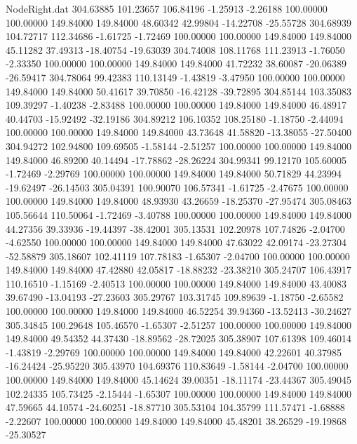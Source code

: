 \begin{filecontents}{NodeRight.dat}
 304.63885  101.23657  106.84196    -1.25913   -2.26188  100.00000  100.00000  149.84000  149.84000   48.60342   42.99804  -14.22708  -25.55728
 304.68939  104.72717  112.34686    -1.61725   -1.72469  100.00000  100.00000  149.84000  149.84000   45.11282   37.49313  -18.40754  -19.63039
 304.74008  108.11768  111.23913    -1.76050   -2.33350  100.00000  100.00000  149.84000  149.84000   41.72232   38.60087  -20.06389  -26.59417
 304.78064   99.42383  110.13149    -1.43819   -3.47950  100.00000  100.00000  149.84000  149.84000   50.41617   39.70850  -16.42128  -39.72895
 304.85144  103.35083  109.39297    -1.40238   -2.83488  100.00000  100.00000  149.84000  149.84000   46.48917   40.44703  -15.92492  -32.19186
 304.89212  106.10352  108.25180    -1.18750   -2.44094  100.00000  100.00000  149.84000  149.84000   43.73648   41.58820  -13.38055  -27.50400
 304.94272  102.94800  109.69505    -1.58144   -2.51257  100.00000  100.00000  149.84000  149.84000   46.89200   40.14494  -17.78862  -28.26224
 304.99341   99.12170  105.60005    -1.72469   -2.29769  100.00000  100.00000  149.84000  149.84000   50.71829   44.23994  -19.62497  -26.14503
 305.04391  100.90070  106.57341    -1.61725   -2.47675  100.00000  100.00000  149.84000  149.84000   48.93930   43.26659  -18.25370  -27.95474
 305.08463  105.56644  110.50064    -1.72469   -3.40788  100.00000  100.00000  149.84000  149.84000   44.27356   39.33936  -19.44397  -38.42001
 305.13531  102.20978  107.74826    -2.04700   -4.62550  100.00000  100.00000  149.84000  149.84000   47.63022   42.09174  -23.27304  -52.58879
 305.18607  102.41119  107.78183    -1.65307   -2.04700  100.00000  100.00000  149.84000  149.84000   47.42880   42.05817  -18.88232  -23.38210
 305.24707  106.43917  110.16510    -1.15169   -2.40513  100.00000  100.00000  149.84000  149.84000   43.40083   39.67490  -13.04193  -27.23603
 305.29767  103.31745  109.89639    -1.18750   -2.65582  100.00000  100.00000  149.84000  149.84000   46.52254   39.94360  -13.52413  -30.24627
 305.34845  100.29648  105.46570    -1.65307   -2.51257  100.00000  100.00000  149.84000  149.84000   49.54352   44.37430  -18.89562  -28.72025
 305.38907  107.61398  109.46014    -1.43819   -2.29769  100.00000  100.00000  149.84000  149.84000   42.22601   40.37985  -16.24424  -25.95220
 305.43970  104.69376  110.83649    -1.58144   -2.04700  100.00000  100.00000  149.84000  149.84000   45.14624   39.00351  -18.11174  -23.44367
 305.49045  102.24335  105.73425    -2.15444   -1.65307  100.00000  100.00000  149.84000  149.84000   47.59665   44.10574  -24.60251  -18.87710
 305.53104  104.35799  111.57471    -1.68888   -2.22607  100.00000  100.00000  149.84000  149.84000   45.48201   38.26529  -19.19868  -25.30527

\end{filecontents}
